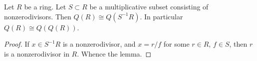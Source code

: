 \begin{lemma}
\label{lemma-total-ring-fractions}
Let $R$ be a ring.
Let $S \subset R$ be a multiplicative subset consisting of nonzerodivisors.
Then $Q(R) \cong Q(S^{-1}R)$.
In particular $Q(R) \cong Q(Q(R))$.
\end{lemma}

\begin{proof}
If $x \in S^{-1}R$ is a nonzerodivisor, and
$x = r/f$ for some $r \in R$, $f \in S$, then
$r$ is a nonzerodivisor in $R$. Whence the lemma.
\end{proof}